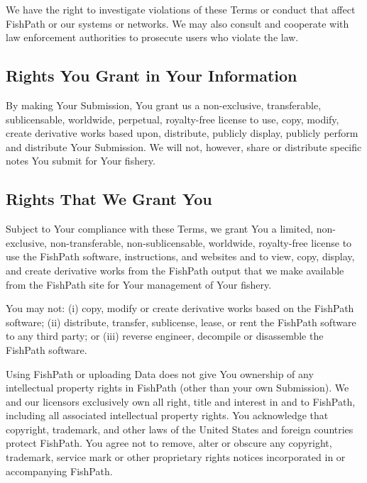\documentclass[11pt,]{book}
\begin{document}
We have the right to investigate violations of these Terms or conduct
that affect FishPath or our systems or networks. We may also consult and
cooperate with law enforcement authorities to prosecute users who
violate the law.

\hypertarget{rights-you-grant-in-your-information}{%
\subsection*{Rights You Grant in Your
Information}\label{rights-you-grant-in-your-information}}

By making Your Submission, You grant us a non-exclusive, transferable,
sublicensable, worldwide, perpetual, royalty-free license to use, copy,
modify, create derivative works based upon, distribute, publicly
display, publicly perform and distribute Your Submission. We will not,
however, share or distribute specific notes You submit for Your fishery.

\hypertarget{rights-that-we-grant-you}{%
\subsection*{Rights That We Grant You}\label{rights-that-we-grant-you}}

Subject to Your compliance with these Terms, we grant You a limited,
non-exclusive, non-transferable, non-sublicensable, worldwide,
royalty-free license to use the FishPath software, instructions, and
websites and to view, copy, display, and create derivative works from
the FishPath output that we make available from the FishPath site for
Your management of Your fishery.

You may not: (i) copy, modify or create derivative works based on the
FishPath software; (ii) distribute, transfer, sublicense, lease, or rent
the FishPath software to any third party; or (iii) reverse engineer,
decompile or disassemble the FishPath software.

Using FishPath or uploading Data does not give You ownership of any
intellectual property rights in FishPath (other than your own
Submission). We and our licensors exclusively own all right, title and
interest in and to FishPath, including all associated intellectual
property rights. You acknowledge that copyright, trademark, and other
laws of the United States and foreign countries protect FishPath. You
agree not to remove, alter or obscure any copyright, trademark, service
mark or other proprietary rights notices incorporated in or accompanying
FishPath.
\end{document}
